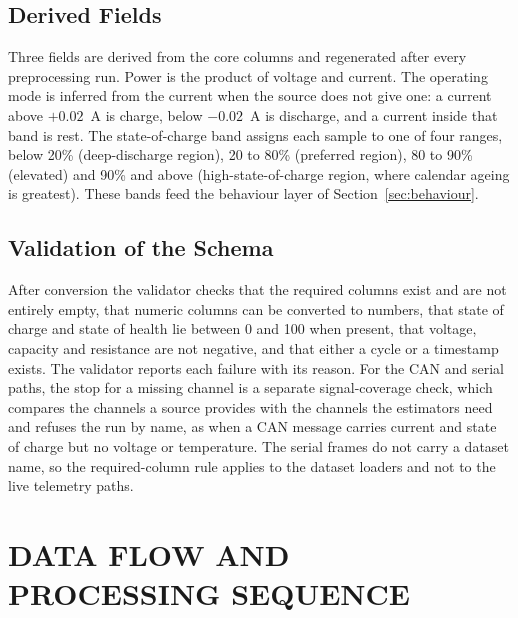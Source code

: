 \subsection{Derived Fields}

Three fields are derived from the core columns and regenerated after every preprocessing run. Power is the product of voltage and current. The operating mode is inferred from the current when the source does not give one: a current above $+0.02$~A is charge, below $-0.02$~A is discharge, and a current inside that band is rest. The state-of-charge band assigns each sample to one of four ranges, below 20\% (deep-discharge region), 20 to 80\% (preferred region), 80 to 90\% (elevated) and 90\% and above (high-state-of-charge region, where calendar ageing is greatest). These bands feed the behaviour layer of Section~\ref{sec:behaviour}.

\subsection{Validation of the Schema}

After conversion the validator checks that the required columns exist and are not entirely empty, that numeric columns can be converted to numbers, that state of charge and state of health lie between 0 and 100 when present, that voltage, capacity and resistance are not negative, and that either a cycle or a timestamp exists. The validator reports each failure with its reason. For the CAN and serial paths, the stop for a missing channel is a separate signal-coverage check, which compares the channels a source provides with the channels the estimators need and refuses the run by name, as when a CAN message carries current and state of charge but no voltage or temperature. The serial frames do not carry a dataset name, so the required-column rule applies to the dataset loaders and not to the live telemetry paths.

\section{DATA FLOW AND PROCESSING SEQUENCE}

